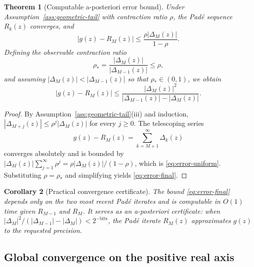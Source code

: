 \documentclass[11pt]{article}
\newtheorem{theorem}{Theorem}[section]
\newtheorem{corollary}[theorem]{Corollary}
\theoremstyle{definition}
\theoremstyle{remark}
\begin{document}
\begin{theorem}[Computable a-posteriori error bound]
\label{thm:error-bound}
Under Assumption~\ref{ass:geometric-tail} with contraction ratio $\rho$, the Pad\'e sequence $R_{k}(z)$ converges, and
\begin{equation}
|g(z)-R_{M}(z)|\le \frac{\rho|\Delta_{M}(z)|}{1-\rho}.
\label{eq:error-uniform}
\end{equation}
Defining the observable contraction ratio
\begin{equation}
\rho_{\ast}=\frac{|\Delta_{M}(z)|}{|\Delta_{M-1}(z)|}\le\rho,
\label{eq:rho-star}
\end{equation}
and assuming $|\Delta_{M}(z)|<|\Delta_{M-1}(z)|$ so that $\rho_{\ast}\in(0,1)$, we obtain
\begin{equation}
\boxed{\;|g(z)-R_{M}(z)|\le \frac{|\Delta_{M}(z)|^{2}}{|\Delta_{M-1}(z)|-|\Delta_{M}(z)|}.\;}
\label{eq:error-final}
\end{equation}
\end{theorem}

\begin{proof}
By Assumption~\ref{ass:geometric-tail}(iii) and induction, $|\Delta_{M+j}(z)|\le\rho^{j}|\Delta_{M}(z)|$ for every $j\ge 0$. The telescoping series
\begin{equation}
g(z)-R_{M}(z)=\sum_{k=M+1}^{\infty}\Delta_{k}(z)
\label{eq:telescoping}
\end{equation}
converges absolutely and is bounded by $|\Delta_{M}(z)|\sum_{j=1}^{\infty}\rho^{j}=\rho|\Delta_{M}(z)|/(1-\rho)$, which is \eqref{eq:error-uniform}. Substituting $\rho=\rho_{\ast}$ and simplifying yields \eqref{eq:error-final}.
\end{proof}

\begin{corollary}[Practical convergence certificate]
\label{cor:practical-cert}
The bound \eqref{eq:error-final} depends only on the two most recent Pad\'e iterates and is computable in $O(1)$ time given $R_{M-1}$ and $R_{M}$. It serves as an a-posteriori certificate: when $|\Delta_{M}|^{2}/(|\Delta_{M-1}|-|\Delta_{M}|)<2^{-\mathrm{bits}}$, the Pad\'e iterate $R_{M}(z)$ approximates $g(z)$ to the requested precision.
\end{corollary}

\subsection{Global convergence on the positive real axis}
\label{sec:heston-global}
\end{document}
